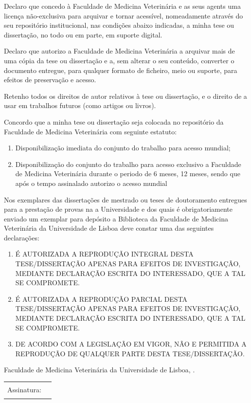 Declaro que concedo à Faculdade de Medicina Veterinária e as seus agents uma licença não-exclusiva para arquivar e tornar acessível, nomeadamente através do seu repositório institucional, nas condições abaixo indicadas, a minha tese ou dissertação, no todo ou em parte, em suporte digital.

Declaro que autorizo a Faculdade de Medicina Veterinária a arquivar mais de uma cópia da tese ou dissertação e a, sem alterar o seu conteúdo, converter o documento entregue, para qualquer formato de ficheiro, meio ou suporte, para efeitos de preservação e acesso.

Retenho todos os direitos de autor relativos à tese ou dissertação, e o direito de a usar em trabalhos futuros (como artigos ou livros).

Concordo que a minha tese ou dissertação seja colocada no repositório da Faculdade de Medicina Veterinária com seguinte estatuto:
\begin{enumerate}
  \item {} Disponibilização imediata do conjunto do trabalho para acesso mundial;
  \item {} Disponibilização do conjunto do trabalho para acesso exclusivo a Faculdade de Medicina Veterinária durante o periodo de  6 meses,
 12 meses, sendo que após o tempo assinalado autorizo o acesso mundial%
\end{enumerate}

{\footnotesize Nos exemplares das dissertações de mestrado ou teses de doutoramento entregues para a prestação de provas na a
Universidade e dos quais é obrigatoriamente enviado um exemplar para depósito a Biblioteca da Faculdade de Medicina
Veterinária da Universidade de Lisboa deve constar uma das seguintes declarações:}
\begin{enumerate}
  \item [\checkbox{reproduction}{I}]
        É AUTORIZADA A REPRODUÇÃO INTEGRAL DESTA TESE/DISSERTAÇÃO APENAS PARA EFEITOS DE INVESTIGAÇÃO,
        MEDIANTE DECLARAÇÃO ESCRITA DO INTERESSADO, QUE A TAL SE COMPROMETE.
  \item [\checkbox{reproduction}{P}]
        É AUTORIZADA A REPRODUÇÃO PARCIAL DESTA TESE/DISSERTAÇÃO APENAS PARA EFEITOS DE INVESTIGAÇÃO,
        MEDIANTE DECLARAÇÃO ESCRITA DO INTERESSADO, QUE A TAL SE COMPROMETE.
  \item [\checkbox{reproduction}{N}]
        DE ACORDO COM A LEGISLAÇÃO EM VIGOR, NÃO E PERMITIDA A REPRODUÇÃO DE QUALQUER PARTE DESTA
        TESE/DISSERTAÇÃO.
\end{enumerate}

Faculdade de Medicina Veterinária da Universidade de Lisboa,
.\par
\vspace*{2ex}
\begin{tabularx}{\linewidth}{@{}lX@{}}
Assinatura: & \rule{\linewidth}{0.75pt}
\end{tabularx}
\egroup
